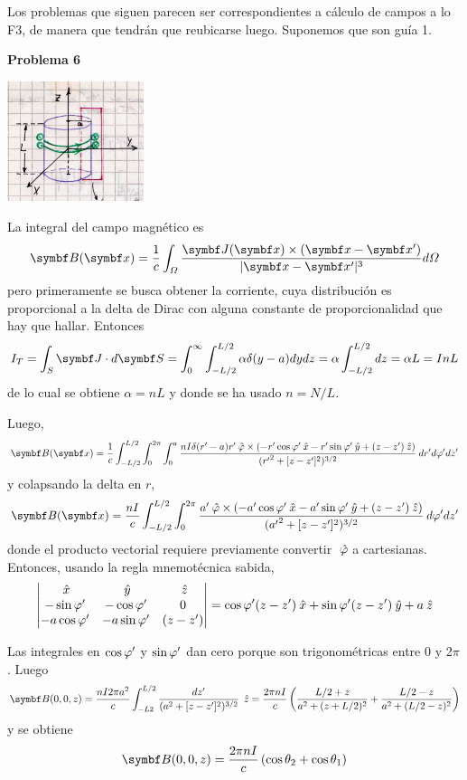 \documentclass[10pt,oneside]{CBFT_book}
\begin{document}
Los problemas que siguen parecen ser correspondientes a cálculo de campos a lo F3, de manera que
tendrán que reubicarse luego. Suponemos que son guía 1.
\begin{ejemplo}{\bf Problema 6}

\includegraphics[width=0.3\textwidth]{images/fig_ft1_setproblemasG1_1.jpg}

La integral del campo magnético es
\[
	\vb{B}(\vb{x}) = \frac{1}{c}\int_\Omega  
	\frac{ \vb{J}(\vb{x}) \times (\vb{x}-\vb{x}')}{|\vb{x}-\vb{x}'|^3} d\Omega
\]
pero primeramente se busca obtener la corriente, cuya distribución es proporcional a la delta
de Dirac con alguna constante de proporcionalidad que hay que hallar. Entonces
\[
	I_T = \int_S \vb{J}\cdot d\vb{S} = \int_0^\infty \int_{-L/2}^{L/2} \alpha \delta(y-a) dy dz =
	\alpha \int_{-L/2}^{L/2} dz = \alpha L = I n L
\]
de lo cual se obtiene $\alpha = n L$ y donde se ha usado $n=N/L$.

Luego,
\[
	\vb{B}(\vb{x}) = \frac{1}{c} \int_{-L/2}^{L/2} \int_0^{2\pi} \int_0^a 
	\frac{ n I \delta(r'-a) r' \phiver \times ( -r'\cos\vp'\xver - r'\sin\vp'\yver + (z-z')\zver) }
	{({r'}^2 + [z-z']^2)^{3/2}} \: dr' d\vp' dz'
\]
y colapsando la delta en $r$,
\[
	\vb{B}(\vb{x}) = \frac{n I}{c} \int_{-L/2}^{L/2} \int_0^{2\pi} 
	\frac{ a' \phiver \times ( -a'\cos\vp'\xver - a'\sin\vp'\yver + (z-z')\zver) }
	{({a'}^2 + [z-z']^2)^{3/2}} \: d\vp' dz'
\]
donde el producto vectorial requiere previamente convertir $\:\hat{\varphi}$ a cartesianas.
Entonces, usando la regla mnemotécnica sabida,
\[
	\begin{vmatrix}
	\:\hat{x} & \:\hat{y} & \:\hat{z} \\
	 -\sin\varphi' & -\cos\varphi' & 0 \\
	 -a\cos\varphi' & -a\sin\varphi' & (z-z')\\
	\end{vmatrix}
	= \cos\varphi'(z-z')\:\hat{x} + \sin\varphi'(z-z')\:\hat{y} + a\:\hat{z}
\]

Las integrales en $\cos\varphi'$ y $\sin\varphi'$ dan cero porque son trigonométricas entre 0 y 2$\pi$.
Luego
\[
	\vb{B}(0,0,z) = \frac{n I 2 \pi a^2}{ c } \int_{-L2}^{L/2} \frac{ dz'}{( a^2 + [z-z']^2)^{3/2}} \: \zver =
	\frac{2 \pi n I}{c } \left( \frac{L/2 + z}{a^2 + (z+L/2)^2 } + \frac{L/2 - z}{a^2 + (L/2 - z)^2} \right)
\]
y se obtiene 
\[
	\vb{B}(0,0,z) = \frac{2 \pi n I}{c}\left( \cos\theta_2 + \cos\theta_1 \right)
\]


\end{ejemplo}
\end{document}
